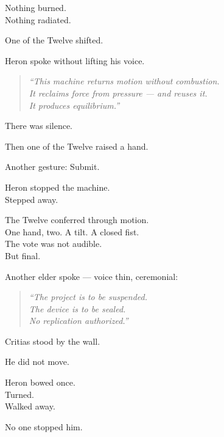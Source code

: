 \documentclass[9pt]{article}
\begin{document}
Nothing burned.\\
Nothing radiated.

One of the Twelve shifted.

\vspace{1em}

Heron spoke without lifting his voice.

\begin{quote}
\textit{“This machine returns motion without combustion.\\
It reclaims force from pressure — and reuses it.\\
It produces equilibrium.”}
\end{quote}

\vspace{1em}

There was silence.

Then one of the Twelve raised a hand.

Another gesture: Submit.

\vspace{1em}

Heron stopped the machine.\\
Stepped away.

\vspace{1em}

The Twelve conferred through motion.\\
One hand, two. A tilt. A closed fist.\\
The vote was not audible.\\
But final.

Another elder spoke — voice thin, ceremonial:

\begin{quote}
\textit{“The project is to be suspended.\\
The device is to be sealed.\\
No replication authorized.”}
\end{quote}

\vspace{1em}

Critias stood by the wall.

He did not move.

\vspace{1em}

Heron bowed once.\\
Turned.\\
Walked away.

No one stopped him.

\newpage
\end{document}
